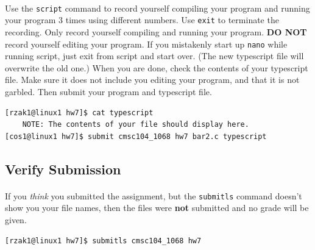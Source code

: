 \documentclass[letter,11pt]{article}
\begin{document}
\paragraph{}Use the \texttt{script} command to record yourself compiling your program and running your program 3 times using different numbers. Use \texttt{exit} to terminate the recording. Only record yourself compiling and running your program. \textbf{DO NOT} record yourself editing your program. If you mistakenly start up \texttt{nano} while running script, just exit from script and start over. (The new typescript file will overwrite the old one.) When you are done, check the contents of your typescript file. Make sure it does not include you editing your program, and that it is not garbled. Then submit your program and typescript file.
\begin{verbatim}
[rzak1@linux1 hw7]$ cat typescript
    NOTE: The contents of your file should display here.
[cos1@linux1 hw7]$ submit cmsc104_1068 hw7 bar2.c typescript
\end{verbatim}

\subsection*{Verify Submission}
\paragraph{}If you \textit{think} you submitted the assignment, but the \texttt{submitls} command doesn't show you your file names, then the files were \textbf{not} submitted and no grade will be given.
\begin{verbatim}
[rzak1@linux1 hw7]$ submitls cmsc104_1068 hw7
\end{verbatim}
\end{document}
